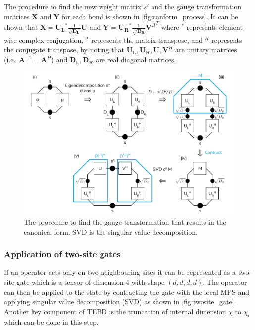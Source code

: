 \documentclass[a4paper, headsepline, footheight=13.6pt]{scrartcl}
\begin{document}
The procedure to find the new weight matrix $s'$ and the gauge transformation matrices $\mathbf{X}$ and $\mathbf{Y}$ for each bond is shown in \autoref{fig:canform_process}. It can be shown that $\mathbf{X} = \mathbf{U_L}^* \frac1{\sqrt{\mathbf{D_L}}} \mathbf{U}$ and $\mathbf{Y} = \mathbf{U_R}^* \frac1{\sqrt{\mathbf{D_R}}} {\mathbf{V}^H}^T$ where $^*$ represents element-wise complex conjugation, $^T$ represents the matrix transpose, and $^H$ represents the conjugate transpose, by noting that $\mathbf{U_L}, \mathbf{U_R}, \mathbf{U}, \mathbf{V}^H$ are unitary matrices (i.e.\ $\mathbf{A}^{-1} = \mathbf{A}^H$) and $\mathbf{D_L}, \mathbf{D_R}$ are real diagonal matrices.

\begin{figure}[htbp]
    \centering
    \includegraphics[width=\textwidth]{figures/canonical_form_process.pdf}
    \caption{The procedure to find the gauge transformation that results in the canonical form. SVD is the singular value decomposition.}
    \label{fig:canform_process}
\end{figure}

\subsubsection{Application of two-site gates}
If an operator acts only on two neighbouring sites it can be represented as a two-site gate which is a tensor of dimension 4 with shape $(d, d, d, d)$. The operator can then be applied to the state by contracting the gate with the local MPS and applying singular value decomposition (SVD) as shown in \autoref{fig:twosite_gate}. Another key component of TEBD is the truncation of internal dimension $\chi$ to $\chi_\epsilon$ which can be done in this step.
\end{document}
